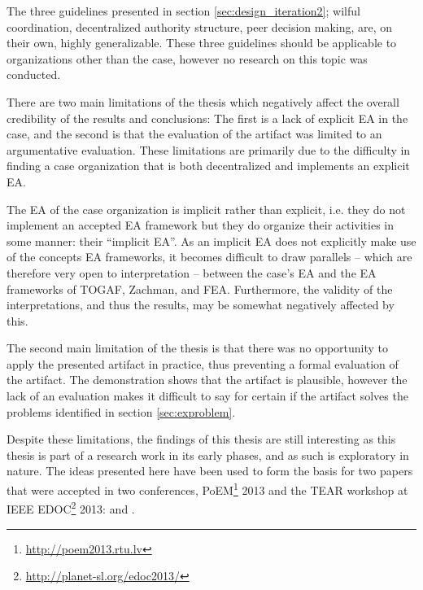 %
%
%
%
%
%
The three guidelines presented in section \ref{sec:design_iteration2}; wilful coordination, decentralized authority structure, peer decision making, are, on their own, highly generalizable. These three guidelines should be applicable to organizations other than the case, however no research on this topic was conducted.

There are two main limitations of the thesis which negatively affect the overall credibility of the results and conclusions: The first is a lack of explicit EA in the case, and the second is that the evaluation of the artifact was limited to an argumentative evaluation. These limitations are primarily due to the difficulty in finding a case organization that is both decentralized and implements an explicit EA. 

The EA of the case organization is implicit rather than explicit, i.e. they do not implement an accepted EA framework but they do organize their activities in some manner: their ``implicit EA''. As an implicit EA does not explicitly make use of the concepts EA frameworks, it becomes difficult to draw parallels -- which are therefore very open to interpretation -- between the case's EA and the EA frameworks of TOGAF, Zachman, and FEA.  Furthermore, the validity of the interpretations, and thus the results, may be somewhat negatively affected by this.

The second main limitation of the thesis is that there was no opportunity to apply the presented artifact in practice, thus preventing a formal evaluation of the artifact. The demonstration shows that the artifact is plausible, however the lack of an evaluation makes it difficult to say for certain if the artifact solves the problems identified in section \ref{sec:exproblem}.

Despite these limitations, the findings of this thesis are still interesting as this thesis is part of a research work in its early phases, and as such is exploratory in nature. The ideas presented here have been used to form the basis for two papers that were accepted in two conferences, PoEM\footnote{\url{http://poem2013.rtu.lv}} 2013 and the TEAR workshop at IEEE EDOC\footnote{\url{http://planet-sl.org/edoc2013/}} 2013: \cite{speckert2013} and \cite{rychkova2013}.

  
